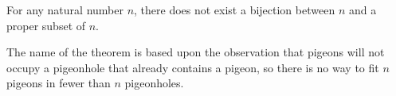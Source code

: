 \documentclass{article}
\begin{document}
For any natural number $n$, there does not exist a bijection between $n$ and a proper subset of $n$.

The name of the theorem is based upon the observation that pigeons will not occupy a pigeonhole that already contains a pigeon, so there is no way to fit $n$ pigeons in fewer than $n$ pigeonholes.
\end{document}
